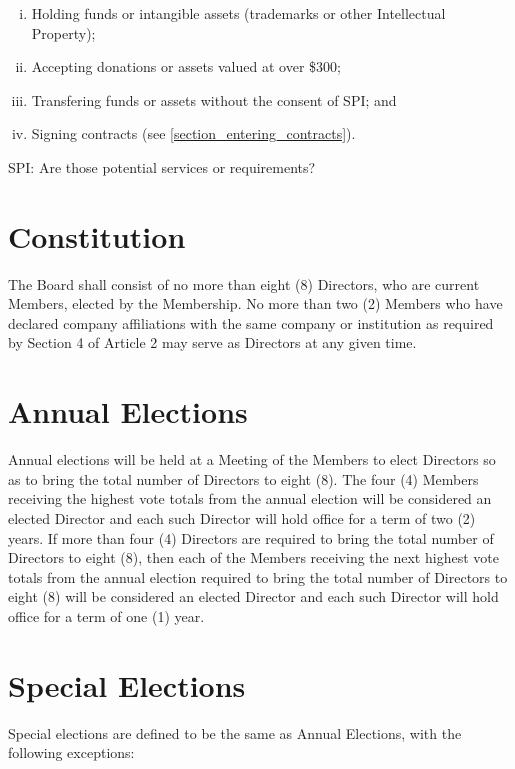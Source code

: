 \documentclass[10pt, english]{bylaws}
\begin{document}
\begin{enumerate}[(i)\hspace{.2cm}]
	\item Holding funds or intangible assets (trademarks or other
Intellectual Property);

	\item Accepting donations or assets valued at over \$300;

	\item Transfering funds or assets without the consent of SPI; and

	\item Signing contracts (see \ref{section_entering_contracts}).
\end{enumerate}

SPI: Are those potential services or requirements?

\section{Constitution}
The Board shall consist of no more than eight (8) Directors, who are current
Members, elected by the Membership.  No more than two (2) Members who have
declared company affiliations with the same company or institution as required
by Section 4 of Article 2 may serve as Directors at any given time.

\section{Annual Elections}
Annual elections will be held at a Meeting of the Members to elect Directors so
as to bring the total number of Directors to eight (8).  The four (4) Members
receiving the highest vote totals from the annual election will be considered an
elected Director and each such Director will hold office for a term of two (2)
years.  If more than four (4) Directors are required to bring
the total number of Directors to eight (8), then each of the Members receiving
the next highest vote totals from the annual election required to bring the
total number of Directors to eight (8) will be considered an elected Director
and each such Director will hold office for a term of one (1) year.

\section{Special Elections}
Special elections are defined to be the same as Annual Elections, with the
following exceptions:
\end{document}
